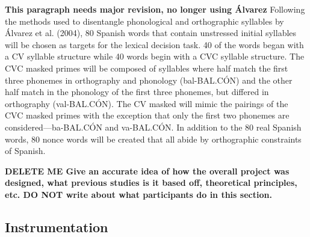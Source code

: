 \textbf{This paragraph needs major revision, no longer using Álvarez}
Following the methods used to disentangle phonological and orthographic syllables by Álvarez et al. (2004), 80 Spanish words that contain unstressed initial syllables will be chosen as targets for the lexical decision task. 40 of the words began with a CV syllable structure while 40 words begin with a CVC syllable structure. The CVC masked primes will be composed of syllables where half match the first three phonemes in orthography and phonology (bal-BAL.CÓN) and the other half match in the phonology of the first three phonemes, but differed in orthography (val-BAL.CÓN). The CV masked will mimic the pairings of the CVC masked primes with the exception that only the first two phonemes are considered—ba-BAL.CÓN and va-BAL.CÓN. In addition to the 80 real Spanish words, 80 nonce words will be created that all abide by orthographic constraints of Spanish.

\textbf{DELETE ME Give an accurate idea of how the overall project was designed, what previous studies is it based off, theoretical principles, etc.
DO NOT write about what participants do in this section.}

\subsection{Instrumentation}

